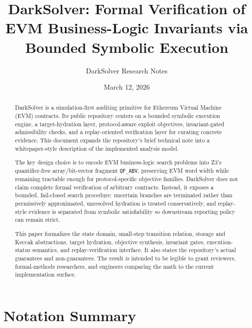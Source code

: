 \documentclass[11pt]{article}
\title{DarkSolver: Formal Verification of EVM Business-Logic Invariants via Bounded \QFABV{} Symbolic Execution}
\author{DarkSolver Research Notes}
\date{March 12, 2026}
\numberwithin{equation}{section}
\theoremstyle{remark}
\newcommand{\QFABV}{\texttt{QF\_ABV}}
\begin{document}
\maketitle

\begin{abstract}
DarkSolver is a simulation-first auditing primitive for Ethereum Virtual Machine (EVM) contracts. Its public repository centers on a bounded symbolic execution engine, a target-hydration layer, protocol-aware exploit objectives, invariant-gated admissibility checks, and a replay-oriented verification layer for curating concrete evidence. This document expands the repository's brief technical note into a whitepaper-style description of the implemented analysis model.

The key design choice is to encode EVM business-logic search problems into Z3's quantifier-free array/bit-vector fragment \QFABV{}, preserving EVM word width while remaining tractable enough for protocol-specific objective families. DarkSolver does not claim complete formal verification of arbitrary contracts. Instead, it exposes a bounded, fail-closed search procedure: uncertain branches are terminated rather than permissively approximated, unresolved hydration is treated conservatively, and replay-style evidence is separated from symbolic satisfiability so downstream reporting policy can remain strict.

This paper formalizes the state domain, small-step transition relation, storage and Keccak abstractions, target hydration, objective synthesis, invariant gates, execution-status semantics, and replay-verification interface. It also states the repository's actual guarantees and non-guarantees. The result is intended to be legible to grant reviewers, formal-methods researchers, and engineers comparing the math to the current implementation surface.
\end{abstract}

\section*{Notation Summary}
\end{document}
